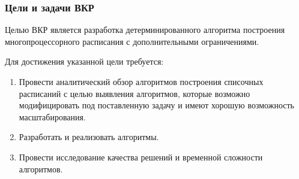 \begin{frame}
    \frametitle{Цели и задачи ВКР}
    Целью ВКР является разработка детерминированного алгоритма построения многопроцессорного расписания с дополнительными ограничениями.

    Для достижения указанной цели требуется:
    \begin{enumerate}
        \item Провести аналитический обзор алгоритмов построения списочных расписаний с целью выявления алгоритмов, которые возможно модифицировать под поставленную задачу и имеют хорошую возможность масштабирования.
        \item Разработать и реализовать алгоритмы.
        \item Провести исследование качества решений и временной сложности алгоритмов.
    \end{enumerate}
\end{frame}